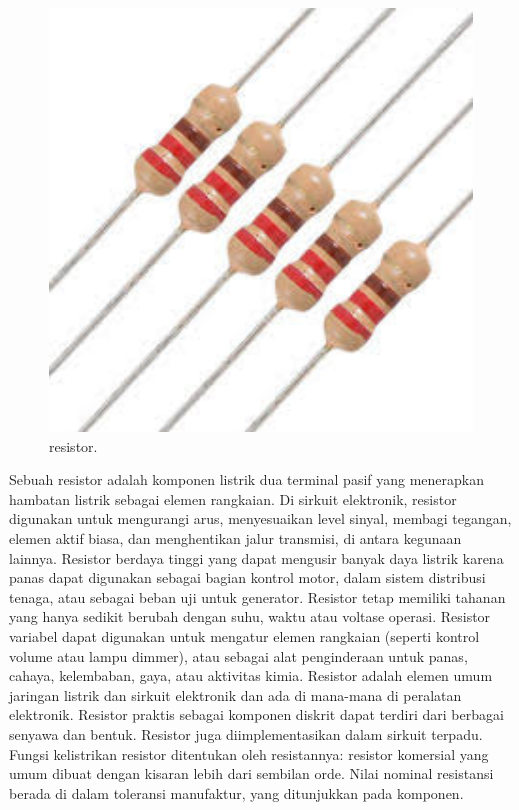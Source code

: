 \begin{figure}[ht]
	\centerline{\includegraphics[width=1\textwidth]{figures/resistor.JPG}}
	\caption{resistor.}
	\label{OA:resistor}
\end{figure}
	
Sebuah resistor adalah komponen listrik dua terminal pasif yang menerapkan hambatan listrik sebagai elemen rangkaian. Di sirkuit elektronik, resistor digunakan 
untuk mengurangi arus, menyesuaikan level sinyal, membagi tegangan, elemen aktif biasa, dan menghentikan jalur transmisi, di antara kegunaan lainnya. Resistor 
berdaya tinggi yang dapat mengusir banyak daya listrik karena panas dapat digunakan sebagai bagian kontrol motor, dalam sistem distribusi tenaga, atau sebagai 
beban uji untuk generator. Resistor tetap memiliki tahanan yang hanya sedikit berubah dengan suhu, waktu atau voltase operasi. Resistor variabel dapat digunakan 
untuk mengatur elemen rangkaian (seperti kontrol volume atau lampu dimmer), atau sebagai alat penginderaan untuk panas, cahaya, kelembaban, gaya, atau aktivitas 
kimia. Resistor adalah elemen umum jaringan listrik dan sirkuit elektronik dan ada di mana-mana di peralatan elektronik. Resistor praktis sebagai komponen diskrit dapat terdiri dari berbagai senyawa dan bentuk. Resistor juga diimplementasikan dalam sirkuit terpadu.
Fungsi kelistrikan resistor ditentukan oleh resistannya: resistor komersial yang umum dibuat dengan kisaran lebih dari sembilan orde. Nilai nominal resistansi berada di dalam toleransi manufaktur, yang ditunjukkan pada komponen.
